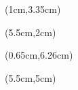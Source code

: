 \begin{frame}
\begin{overlayarea}{\textwidth}{3cm}
{\begin{center} \englishfont \footnotesize
\begin{textblock*}{\textwidth}(1cm,3.35cm)
{\LARGE{\color{red}}}
\end{textblock*}
\end{center}

\begin{center} \englishfont \footnotesize
\begin{textblock*}{\textwidth}(5.5cm,2cm)
{\LARGE{\color{red}}}
\end{textblock*}
\end{center}

\begin{center} \englishfont \footnotesize
\begin{textblock*}{\textwidth}(0.65cm,6.26cm)
{\LARGE{\color{red}}}
\end{textblock*}
\end{center}

\begin{center} \englishfont \footnotesize
\begin{textblock*}{\textwidth}(5.5cm,5cm)
{\LARGE{\color{red}}}
\end{textblock*}
\end{center}
}

\end{overlayarea}
\end{frame}